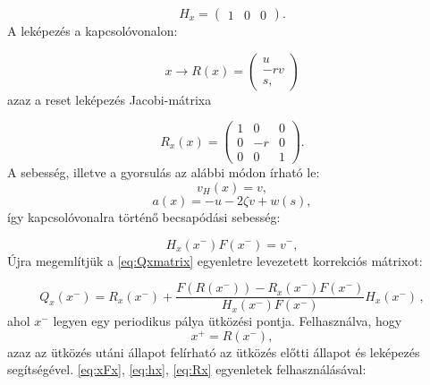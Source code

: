 \begin{equation}\label{eq:hx}
H_x=\begin{pmatrix}1&0&0\end{pmatrix}.
\end{equation}
A leképezés a kapcsolóvonalon:

\begin{equation}
x \rightarrow R(x)=\begin{pmatrix}
u\\
-r v\\
s,
\end{pmatrix}
\end{equation}
azaz a reset leképezés Jacobi-mátrixa

\begin{equation}\label{eq:Rx}
R_x(x)=\begin{pmatrix}
1 & 0 & 0\\
0 & -r & 0\\
0 & 0 & 1
\end{pmatrix}.
\end{equation}
A sebesség, illetve a gyorsulás az alábbi módon írható le:
\begin{equation}
v_H(x)=v,
\end{equation}
\begin{equation}
a(x)=-u-2\zeta v+w(s),
\end{equation}
így kapcsolóvonalra történő becsapódási sebesség:

\begin{equation}
H_x(x^-) F(x^-) = v^-,
\end{equation}
Újra megemlítjük a \eqref{eq:Qxmatrix} egyenletre levezetett korrekciós mátrixot:

\begin{equation}\label{eq:Qxmatrix2}
Q_x(x^-)=R_x(x^-)+\frac{F(R(x^-))-R_x(x^-)F(x^-)}{H_x(x^-)F(x^-)}H_x(x^-)\,,
\end{equation}
ahol $x^-$ legyen egy periodikus pálya ütközési pontja. Felhasználva, hogy
\begin{equation}
x^+=R(x^-),
\end{equation}
azaz az ütközés utáni állapot felírható az ütközés előtti állapot és leképezés segítségével. \eqref{eq:xFx}, \eqref{eq:hx}, \eqref{eq:Rx} egyenletek felhasználásával:

